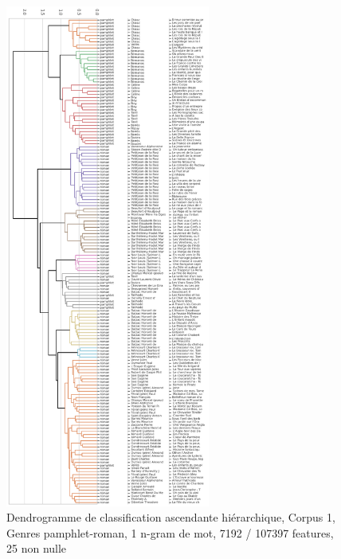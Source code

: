 \begin{figure}
\centering %
\includegraphics[width=0.60\textwidth]{img/dendogram-corpus-mix-PamRoman.png}
\caption{Dendrogramme de classification ascendante hiérarchique, Corpus 1, Genres pamphlet-roman, 1 n-gram de mot, 7192 / 107397 features, 25 non nulle}
\label{'fig:dendogram-corpus-mix-PamRoman'}
\end{figure}

